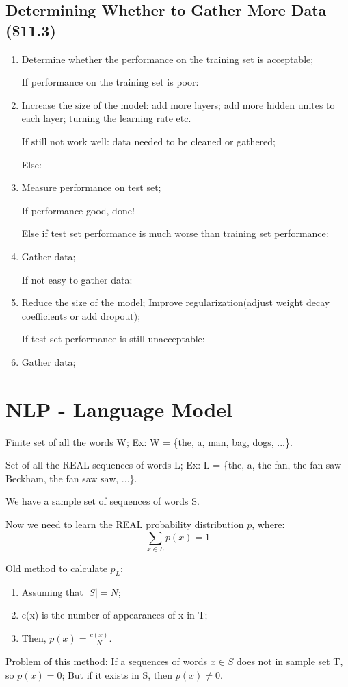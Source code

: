 \documentclass[12pt]{article}
\numberwithin{equation}{section}
\begin{document}
\subsection{Determining Whether to Gather More Data (\$11.3)}
\begin{enumerate}
	\item Determine whether the performance on the training set is acceptable; \par
	If performance on the training set is poor:
	\item Increase the size of the model: add more layers; add more hidden unites to each layer; turning 
	the learning rate etc. \par
	If still not work well: data needed to be cleaned or gathered; \par
	Else:
	\item Measure performance on test set; \par
	If performance good, done!\par
	Else if test set performance is much worse than training set performance:
	\item Gather data;\par
	If not easy to gather data:
	\item Reduce the size of the model; Improve regularization(adjust weight decay coefficients or add dropout); \par
	If test set performance is still unacceptable:
	\item Gather data;
\end{enumerate}
\section{NLP - Language Model}
Finite set of all the words W; Ex: W = \{the, a, man, bag, dogs, ...\}. \par
Set of all the REAL sequences of words L; Ex: L = \{the, a, the fan, the fan saw Beckham, the fan saw saw, ...\}.\par
We have a sample set of sequences of words S.\par
Now we need to learn the REAL probability distribution $p$, where:
\[
\sum_{x \in L} p(x) = 1
\]\par
Old method to calculate $p_{L}$:
\begin{enumerate}
	\item Assuming that $|S| = N$;
	\item c(x) is the number of appearances of x in T;
	\item Then, $p(x)=\frac{c(x)}{N} $.
\end{enumerate}
Problem of this method: If a sequences of words $x \in S$ does not in sample set T, so $p(x)=0$;
But if it exists in S, then $p(x) \neq 0$.
\end{document}
